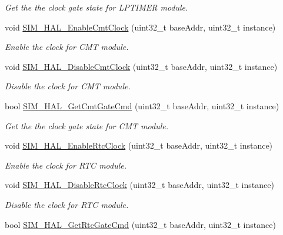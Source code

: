 \begin{DoxyCompactItemize}
\begin{DoxyCompactList}\small\item\em Get the the clock gate state for L\+P\+T\+I\+M\+ER module. \end{DoxyCompactList}\item 
void \hyperlink{group__sim__hal_ga8713400fc4d0cb8df8d38292dbcb76ff}{S\+I\+M\+\_\+\+H\+A\+L\+\_\+\+Enable\+Cmt\+Clock} (uint32\+\_\+t base\+Addr, uint32\+\_\+t instance)
\begin{DoxyCompactList}\small\item\em Enable the clock for C\+MT module. \end{DoxyCompactList}\item 
void \hyperlink{group__sim__hal_ga96bd81cc9f84e6e8525967590dc62ae3}{S\+I\+M\+\_\+\+H\+A\+L\+\_\+\+Disable\+Cmt\+Clock} (uint32\+\_\+t base\+Addr, uint32\+\_\+t instance)
\begin{DoxyCompactList}\small\item\em Disable the clock for C\+MT module. \end{DoxyCompactList}\item 
bool \hyperlink{group__sim__hal_gaef395691247446f206ab5e15d6ea5cf4}{S\+I\+M\+\_\+\+H\+A\+L\+\_\+\+Get\+Cmt\+Gate\+Cmd} (uint32\+\_\+t base\+Addr, uint32\+\_\+t instance)
\begin{DoxyCompactList}\small\item\em Get the the clock gate state for C\+MT module. \end{DoxyCompactList}\item 
void \hyperlink{group__sim__hal_ga03892f00ef5983872377b3fc935442d7}{S\+I\+M\+\_\+\+H\+A\+L\+\_\+\+Enable\+Rtc\+Clock} (uint32\+\_\+t base\+Addr, uint32\+\_\+t instance)
\begin{DoxyCompactList}\small\item\em Enable the clock for R\+TC module. \end{DoxyCompactList}\item 
void \hyperlink{group__sim__hal_gacbbf6cacf3182e0d43f2cff3cc029d1c}{S\+I\+M\+\_\+\+H\+A\+L\+\_\+\+Disable\+Rtc\+Clock} (uint32\+\_\+t base\+Addr, uint32\+\_\+t instance)
\begin{DoxyCompactList}\small\item\em Disable the clock for R\+TC module. \end{DoxyCompactList}\item 
bool \hyperlink{group__sim__hal_ga19e87e8fecea6a081bed860f5a56f8da}{S\+I\+M\+\_\+\+H\+A\+L\+\_\+\+Get\+Rtc\+Gate\+Cmd} (uint32\+\_\+t base\+Addr, uint32\+\_\+t instance)

\end{DoxyCompactItemize}

